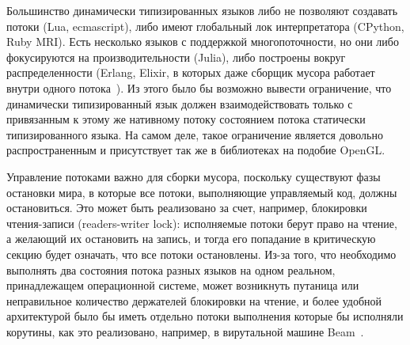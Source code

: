 \documentclass[times
]{itmo-student-thesis}
\begin{document}
Большинство динамически типизированных языков либо не позволяют создавать потоки (Lua, ecmascript), либо имеют глобальный лок интерпретатора (CPython, Ruby MRI). Есть несколько языков с поддержкой многопоточности, но они либо фокусируются на производительности (Julia), либо построены вокруг распределенности (Erlang, Elixir, в которых даже сборщик мусора работает внутри одного потока~\cite{erlang-gc}). Из этого было бы возможно вывести ограничение, что динамически типизированный язык должен взаимодействовать только с привязанным к этому же нативному потоку состоянием потока статически типизированного языка. На самом деле, такое ограничение является довольно распространенным и присутствует так же в библиотеках на подобие OpenGL.

Управление потоками важно для сборки мусора, поскольку существуют фазы остановки мира, в которые все потоки, выполняющие управляемый код, должны остановиться. Это может быть реализовано за счет, например, блокировки чтения-записи (readers-writer lock): исполняемые потоки берут право на чтение, а желающий их остановить на запись, и тогда его попадание в критическую секцию будет означать, что все потоки остановлены. Из-за того, что необходимо выполнять два состояния потока разных языков на одном реальном, принадлежащем операционной системе, может возникнуть путаница или неправильное количество держателей блокировки на чтение, и более удобной архитектурой было бы иметь отдельно потоки выполнения которые бы исполняли корутины, как это реализовано, например, в вирутальной машине Beam~\cite{beam-proc}.
\end{document}
